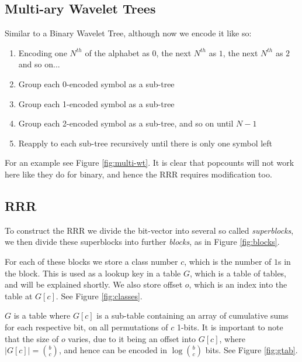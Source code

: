 
\subsection{Multi-ary Wavelet Trees}
Similar to a Binary Wavelet Tree, although now we encode it like so:

\begin{enumerate}
    \item Encoding one $N^{th}$ of the alphabet as $0$, the next $N^{th}$ as $1$,
    the next $N^{th}$ as $2$ and so on...
    \item Group each 0-encoded symbol as a sub-tree
    \item Group each 1-encoded symbol as a sub-tree
    \item Group each 2-encoded symbol as a sub-tree, and so on until $N-1$
    \item Reapply to each sub-tree recursively until there is only one symbol
    left
\end{enumerate}
For an example see Figure \ref{fig:multi-wt}. It is clear that popcounts will not work
here like they do for binary, and hence the RRR requires modification too.


\subsection{RRR}
To construct the RRR we divide the bit-vector into several so called \emph{superblocks}, we then divide these superblocks into further \emph{blocks}, as in Figure \ref{fig:blocks}.

For each of these blocks we store a class number $c$, which is the number of $1$s in the block. This is used as a lookup key in a table $G$, which is a table of tables, and will be explained shortly. We also store offset $o$, which is an index into the table at $G[c]$. See Figure \ref{fig:classes}.

$G$ is a table where $G[c]$ is a sub-table containing an array of cumulative sums for each respective bit, on all permutations of $c$ 1-bits. It is important to note that the size of $o$ varies, due to it being an offset into $G[c]$, where $|G[c]| = \binom{b}{c}$, and hence can be encoded in $\log \binom{b}{c}$ bits. See Figure \ref{fig:gtab}.

